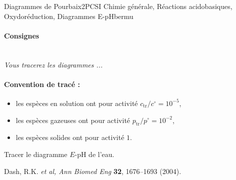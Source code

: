 
\begin{exercise}{Diagrammes de Pourbaix}{2}{PCSI}
{Chimie générale, Réactions acidobasiques, Oxydoréduction, Diagrammes E-pH}{bermu}

\paragraph{Consignes}~\\
\textsl{Vous tracerez les diagrammes ...}

\paragraph{Convention de tracé :}
\begin{itemize}
    \item les espèces en solution ont pour activité $c_\text{tr}/c^\circ = 10^{-5}$,
    \item les espèces gazeuses ont pour activité $p_\text{tr}/p^\circ = 10^{-2}$,
    \item les espèces solides ont pour activité $1$.
\end{itemize}

\begin{questions}
\questioncours Tracer le diagramme $E$-pH de l'eau.

\end{questions}

\plusloin
Dash, R.K. \emph{et al, Ann Biomed Eng} \textbf{32}, 1676--1693 (2004).

\end{exercise}

